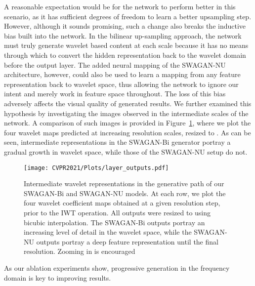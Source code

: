 \documentclass[final]{CVPR2021/cvpr}
\begin{document}
A reasonable expectation would be for the network to perform better in this scenario, as it has sufficient degrees of freedom to learn a better upsampling step. However, although it sounds promising, such a change also breaks the inductive bias built into the network. In the bilinear up-sampling approach, the network must truly generate wavelet based content at each scale because it has no means through which to convert the hidden representation back to the wavelet domain before the output layer. The added neural mapping of the SWAGAN-NU architecture, however, could also be used to learn a mapping from any feature representation back to wavelet space, thus allowing the network to ignore our intent and merely work in feature space throughout. The loss of this bias adversely affects the visual quality of generated results. We further examined this hypothesis by investigating the images observed in the intermediate scales of the network. A comparison of such images is provided in Figure~\ref{fig:layer_outputs}, where we plot the four wavelet maps predicted at increasing resolution scales, resized to . As can be seen, intermediate representations in the SWAGAN-Bi generator portray a gradual growth in wavelet space, while those of the SWAGAN-NU setup do not.

\begin{figure}[t]
\begin{center}
\texttt{[image: CVPR2021/Plots/layer\_outputs.pdf]}
\end{center}
   \caption{Intermediate wavelet representations in the generative path of our SWAGAN-Bi and SWAGAN-NU models. At each row, we plot the four wavelet coefficient maps obtained at a given resolution step, prior to the IWT operation. All outputs were resized to  using bicubic interpolation. The SWAGAN-Bi outputs portray an increasing level of detail in the wavelet space, while the SWAGAN-NU outputs portray a deep feature representation until the final resolution. Zooming in is encouraged }
\label{fig:layer_outputs}
\end{figure}

As our ablation experiments show, progressive generation in the frequency domain is key to improving results.
\end{document}
